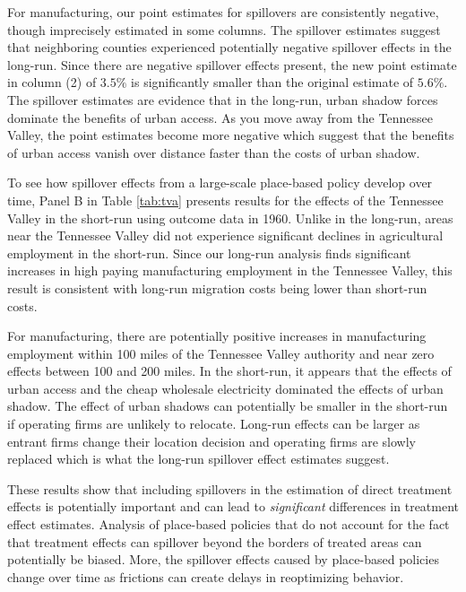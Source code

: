 \documentclass[11pt]{article}
\begin{document}
For manufacturing, our point estimates for spillovers are consistently negative, though imprecisely estimated in some columns. The spillover estimates suggest that neighboring counties experienced potentially negative spillover effects in the long-run. Since there are negative spillover effects present, the new point estimate in column (2) of $3.5\%$ is significantly smaller than the original estimate of $5.6\%$. The spillover estimates are evidence that in the long-run, urban shadow forces dominate the benefits of urban access. As you move away from the Tennessee Valley, the point estimates become more negative which suggest that the benefits of urban access vanish over distance faster than the costs of urban shadow.

To see how spillover effects from a large-scale place-based policy develop over time, Panel B in Table \ref{tab:tva} presents results for the effects of the Tennessee Valley in the short-run using outcome data in 1960. Unlike in the long-run, areas near the Tennessee Valley did not experience significant declines in agricultural employment in the short-run. Since our long-run analysis finds significant increases in high paying manufacturing employment in the Tennessee Valley, this result is consistent with long-run migration costs being lower than short-run costs.

For manufacturing, there are potentially positive increases in manufacturing employment within 100 miles of the Tennessee Valley authority and near zero effects between 100 and 200 miles. In the short-run, it appears that the effects of urban access and the cheap wholesale electricity dominated the effects of urban shadow. The effect of urban shadows can potentially be smaller in the short-run if operating firms are unlikely to relocate. Long-run effects can be larger as entrant firms change their location decision and operating firms are slowly replaced which is what the long-run spillover effect estimates suggest.

These results show that including spillovers in the estimation of direct treatment effects is potentially important and can lead to \emph{significant} differences in treatment effect estimates. Analysis of place-based policies that do not account for the fact that treatment effects can spillover beyond the borders of treated areas can potentially be biased. More, the spillover effects caused by place-based policies change over time as frictions can create delays in reoptimizing behavior. 

\end{document}
